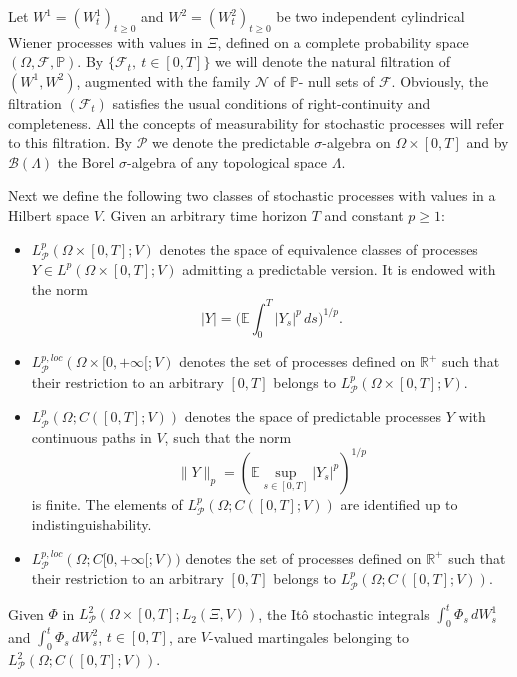 \documentclass[reqno,a4paper,11 pt]{article}
\def \E {\mathbb{E}}
\def \P {\mathcal{P}}
\def \R {\mathbb{R}}
\numberwithin{equation}{section}
\begin{document}
Let $W^1 = (W^1_t)_{t\geq 0}$ and $W^2 = (W^2_t)_{t\geq 0} $ be two independent cylindrical Wiener processes with
values in $\Xi$, defined on a
complete
probability space $(\Omega, \mathcal{F}, \mathbb{P})$.
By $\{\mathcal{F}_t, \ t \in [0,T] \}$ we will denote the natural filtration
of $(W^1,W^2)$, augmented with the family $\mathcal{N}$ of
$\mathbb{P}$- null sets of $\mathcal{F}$. Obviously, the filtration
$(\mathcal{F}_t)$ satisfies the usual conditions of right-continuity and completeness. All the concepts
of measurability for stochastic processes will refer to this filtration.
By $\mathcal{P}$ we denote the predictable $\sigma$-algebra on
$\Omega \times [0,T]$ and by $\mathcal{B}(\Lambda)$ the Borel
$\sigma$-algebra of any topological space $\Lambda$.

Next we define  the following two classes of stochastic processes with values in
a Hilbert space $V$.  Given an arbitrary time horizon  $T$ and constant $p\geq 1$:
\begin{itemize}
\item $L^p_\P (\Omega\times [0,T];V)$ denotes the space of
equivalence classes of processes $Y \in L^p (\Omega\times
[0,T];V)$ admitting a predictable version. It is endowed with the norm
\[ |Y|= \Big(\E \int_0^T |Y_s|^p \, ds\Big)^{1/p}. \]
\item $L^{p, loc}_\P (\Omega\times [0,+\infty[;V)$ denotes the set of processes defined on $\mathbb{R}^+$ such that their  restriction to an arbitrary  $[0,T]$ belongs to $L^p_\P (\Omega\times [0,T];V) $.  
   \item $L^p_{\mathcal{P}}(\Omega;C([0,T];V))$
     denotes the space of
    predictable processes $Y$ with continuous paths in $V$, such
    that the norm
    \[  \|Y\|_p  = (\E \sup _{s \in [0,T]} |Y_s|^p)^{1/p}\]
    is finite. The elements of $L^p_{\mathcal{P}}(\Omega;C([0,T];V))$
    are identified up to indistinguishability.
    \item $L^{p, loc}_\P (\Omega;{C} [0,+\infty[;V))$ denotes the set of processes defined on $\mathbb{R}^+$ such that their  restriction to an arbitrary  $[0,T]$ belongs to $L^p_{\mathcal{P}}(\Omega;C([0,T];V))$. 
\end{itemize}
Given $\Phi$ in  $L^2_\P (\Omega\times
[0,T];L_2(\Xi,V))$, the It\^o stochastic integrals $\int_0^t
\Phi_s \,dW^1_s$ and  $\int_0^t \Phi_s \,dW^2_s$, $t \in
[0,T]$, are  $V$-valued martingales belonging to
$L^2_{\mathcal{P}}(\Omega;C([0,T];V))$.
\end{document}
